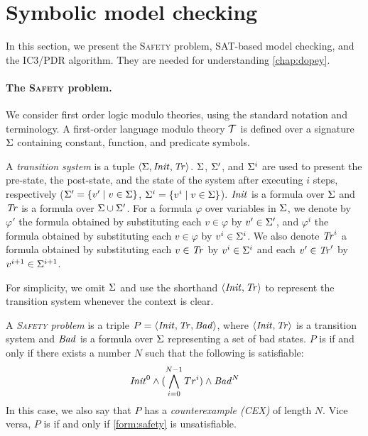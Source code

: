 \section{Symbolic model checking}
\newcommand{\safety}{\textsc{Safety}\xspace}
In this section, we present the \safety problem, SAT-based model checking, and the IC3/PDR algorithm. They are needed for understanding \cref{chap:dopey}.
\paragraph{The \safety problem.}

We consider first order logic modulo theories, using the standard notation and terminology. A first-order language modulo theory $\mathcal{T}$ is defined over a signature $\Sigma$ containing constant, function, and predicate symbols. 

A \emph{transition system} is a tuple $\langle \Sigma, \mathit{Init},
\mathit{Tr} \rangle$.
$\Sigma$, $\Sigma'$, and $\Sigma^i$ are used to present the pre-state, the post-state, and the state of the system after executing $i$ steps, respectively ($\Sigma' = \{v' \mid v \in \Sigma\}$, $\Sigma^i = \{v^i \mid v \in \Sigma\}$). 
$\mathit{Init}$ is a formula over $\Sigma$ and $\mathit{Tr}$ is a formula over $\Sigma \cup \Sigma'$. For a formula $\varphi$ over variables in $\Sigma$, we denote by $\varphi'$ the formula obtained by substituting each $v \in \varphi$ by $v' \in \Sigma'$, and $\varphi^i$ the formula obtained by substituting each $v \in \varphi$ by $v^i \in \Sigma^i$. We also denote $\mathit{Tr}^i$ a formula obtained by substituting each $v \in \mathit{Tr}$ by $v^i \in \Sigma^i$ and each $v' \in \mathit{Tr}'$ by $v^{i+1} \in \Sigma^{i+1}$.


For simplicity, we omit $\Sigma$ and use the shorthand $\langle \mathit{Init}, \mathit{Tr}\rangle$ to represent the
transition system whenever the context is clear.

A \emph{\safety problem} is a triple 
$P = \langle \mathit{Init}, \mathit{Tr}, \mathit{Bad} \rangle$, where
$\langle \mathit{Init}, \mathit{Tr} \rangle$ is a transition system and $\mathit{Bad}$ is a
formula over $\Sigma$ representing a set of bad states. $P$ is \unsafe if and only
if there exists a number $N$ such that the following is satisfiable:
\begin{align}
\label{form:safety}
    \mathit{Init}^0\land (\bigwedge^{N-1}_{i=0}Tr^i)\land \mathit{Bad}^N
\end{align}
In this case, we also say that $P$ has a \emph{counterexample (CEX)} of length $N$. Vice versa, $P$ is \safe if and only if \cref{form:safety} is unsatisfiable.



